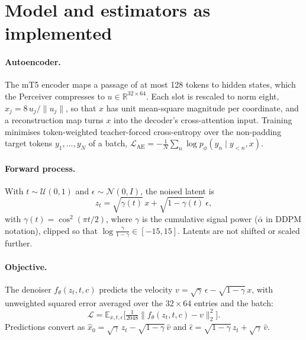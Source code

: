 \documentclass[11pt,a4paper]{article}
\begin{document}



\appendix

\section{Model and estimators as implemented}
\label{app:model}

\paragraph{Autoencoder.} The mT5 encoder maps a passage of at most 128 tokens to hidden states, which the Perceiver compresses to $u\in\mathbb{R}^{32\times64}$. Each slot is rescaled to norm eight, $x_j = 8\,u_j/\lVert u_j\rVert$, so that $x$ has unit mean-square magnitude per coordinate, and a reconstruction map turns $x$ into the decoder's cross-attention input. Training minimises token-weighted teacher-forced cross-entropy over the non-padding target tokens $y_1,\dots,y_N$ of a batch, $\mathcal{L}_{\mathrm{AE}} = -\frac{1}{N}\sum_{n}\log p_\phi(y_n\mid y_{<n},x)$.

\paragraph{Forward process.} With $t\sim\mathcal{U}(0,1)$ and $\epsilon\sim\mathcal{N}(0,I)$, the noised latent is
\begin{equation}
z_t=\sqrt{\gamma(t)}\,x+\sqrt{1-\gamma(t)}\,\epsilon,
\end{equation}
with $\gamma(t)=\cos^2(\pi t/2)$, where $\gamma$ is the cumulative signal power ($\bar\alpha$ in DDPM notation), clipped so that $\log\frac{\gamma}{1-\gamma}\in[-15,15]$. Latents are not shifted or scaled further.

\paragraph{Objective.} The denoiser $f_\theta(z_t,t,c)$ predicts the velocity $v=\sqrt{\gamma}\,\epsilon-\sqrt{1-\gamma}\,x$, with unweighted squared error averaged over the $32\times64$ entries and the batch:
\begin{equation}
\mathcal{L}=\mathbb{E}_{x,t,\epsilon}\Big[\tfrac{1}{2048}\big\lVert f_\theta(z_t,t,c)-v\big\rVert_2^2\Big].
\end{equation}
Predictions convert as $\hat x_0=\sqrt{\gamma}\,z_t-\sqrt{1-\gamma}\,\hat v$ and $\hat\epsilon=\sqrt{1-\gamma}\,z_t+\sqrt{\gamma}\,\hat v$.
\end{document}
